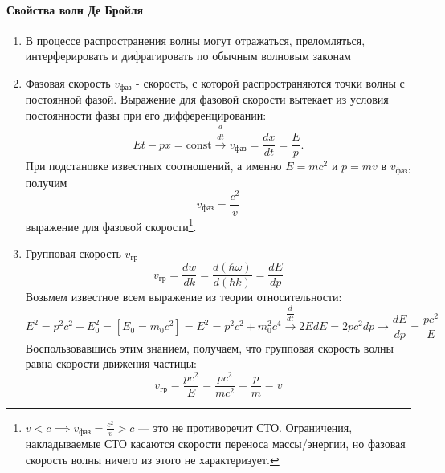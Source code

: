 \paragraph{Свойства волн Де Бройля}
\begin{enumerate}
	\item В процессе распространения волны могут отражаться, преломляться, интерферировать и дифрагировать по обычным волновым законам
	
	\item Фазовая скорость $v_\text{фаз}$ - скорость, с которой распространяются точки волны с постоянной фазой.
	Выражение для фазовой скорости вытекает из условия постоянности фазы при его дифференцировании:
	\begin{equation*}
		Et-px=\mathrm{const} \overset{\dfrac{d}{dt}}{\longrightarrow} v_\text{фаз} = \frac{dx}{dt} = \frac{E}{p}.
	\end{equation*}
	При подстановке известных соотношений, а именно $E=mc^2$ и $p=mv$ в $v_\text{фаз}$, получим
	\begin{equation*}
		v_\text{фаз} = \frac{c^2}{v}
	\end{equation*} выражение для фазовой скорости\footnote{$v<c \implies v_\text{фаз} = \frac{c^2}{v} > c$ --- это не противоречит СТО. Ограничения, накладываемые СТО касаются скорости переноса массы/энергии, но фазовая скорость волны ничего из этого не характеризует.}.
	
	\item Групповая скорость $v_\text{гр}$
	\begin{equation*}
		v_\text{гр} = \frac{dw}{dk} = \frac{d(\hbar\omega)}{d(\hbar k)} = \frac{dE}{dp}
	\end{equation*}
	Возьмем известное всем выражение из теории относительности:
	\begin{equation*}
		E^2=p^2c^2+E_0^2=\left[E_0=m_0c^2\right]=E^2=p^2c^2+m_0^2c^4\overset{\dfrac{d}{dt}}{\longrightarrow}2EdE=2pc^2dp\longrightarrow\frac{dE}{dp}=\frac{pc^2}{E}
	\end{equation*}
	Воспользовавшись этим знанием, получаем, что групповая скорость волны равна скорости движения частицы:
	\begin{equation*}
		v_\text{гр} = \frac{pc^2}{E} = \frac{pc^2}{mc^2} = \frac{p}{m} = v
	\end{equation*}
	

\end{enumerate}
